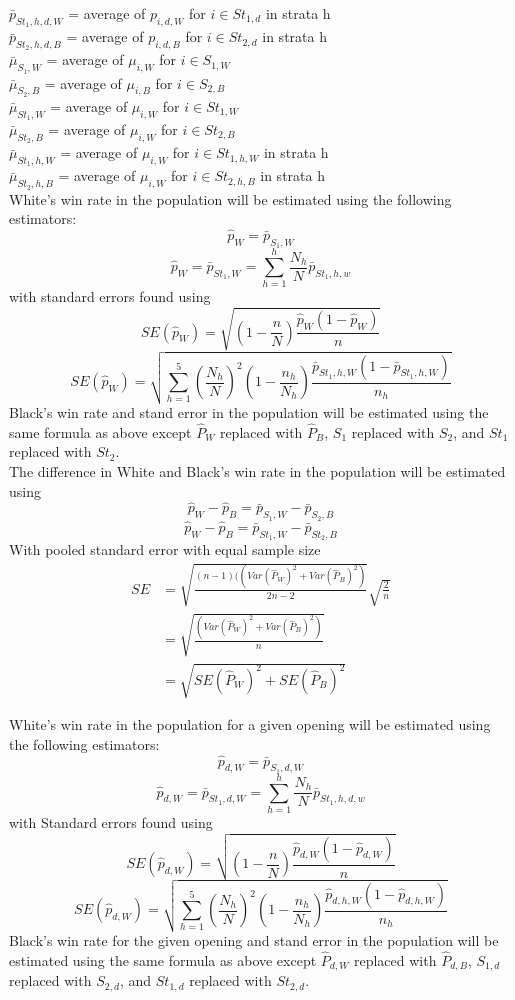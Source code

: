 \documentclass[11pt,]{article}
\begin{document}
\(\bar p_{St_1,h,d,W}\) = average of \(p_{i,d,W}\) for
\(i \in St_{1,d}\) in strata h\\
\(\bar p_{St_2,h,d,B}\) = average of \(p_{i,d,B}\) for
\(i \in St_{2,d}\) in strata h\\
\(\bar \mu_{S_1, W}\) = average of \(\mu_{i,W}\) for \(i \in S_{1,W}\)\\
\(\bar \mu_{S_2, B}\) = average of \(\mu_{i,B}\) for \(i \in S_{2,B}\)\\
\(\bar \mu_{St_1, W}\) = average of \(\mu_{i,W}\) for
\(i \in St_{1,W}\)\\
\(\bar \mu_{St_2, B}\) = average of \(\mu_{i,W}\) for
\(i \in St_{2,B}\)\\
\(\bar \mu_{St_1, h,W}\) = average of \(\mu_{i,W}\) for
\(i \in St_{1,h,W}\) in strata h\\
\(\bar \mu_{St_2, h,B}\) = average of \(\mu_{i,W}\) for
\(i \in St_{2,h,B}\) in strata h\\
\newline White's win rate in the population will be estimated using the
following estimators: \[\hat p_{W} = \bar p_{S_1,W}\]
\[\hat p_{W} = \bar p_{St_1,W} = \sum_{h=1}^{h}\frac{N_h}{N}\bar p_{St_1,h,w}\]
with standard errors found using
\[SE(\hat p_{W}) = \sqrt{(1-\frac{n}{N})\frac{\hat p_{W}(1-\hat p_{W})}{n}}\]
\[SE(\hat p_{W}) = \sqrt{\sum_{h=1}^{5}(\frac{N_h}{N})^2(1-\frac{n_h}{N_h})\frac{\bar p_{St_1,h,W}(1-\bar p_{St_1,h,W})}{n_h}}\]
Black's win rate and stand error in the population will be estimated
using the same formula as above except \(\hat P_{W}\) replaced with
\(\hat P_{B}\), \(S_1\) replaced with \(S_2\), and \(St_1\) replaced
with \(St_2\).\\
\newline The difference in White and Black's win rate in the population
will be estimated using
\[\hat p_{W} - \hat p_{B} = \bar p_{S_1,W} - \bar p_{S_2,B}\]
\[\hat p_{W} - \hat p_{B} = \bar p_{St_1,W} - \bar p_{St_2,B}\] With
pooled standard error with equal sample size \begin{align*}
SE &= \sqrt{\frac{(n-1)((Var(\hat P_W)^2 + Var(\hat P_B)^2)}{2n-2}}\sqrt{\frac{2}{n}}\\
&=\sqrt{\frac{(Var(\hat P_W)^2 + Var(\hat P_B)^2)}{n}}\\
&= \sqrt{SE(\hat P_W)^2 + SE(\hat P_B)^2}
\end{align*} \newline

White's win rate in the population for a given opening will be estimated
using the following estimators: \[\hat p_{d, W} = \bar p_{S_1,d,W} \]
\[\hat p_{d,W} = \bar p_{St_1,d,W} = \sum_{h=1}^{h}\frac{N_h}{N}\bar p_{St_1,h,d,w}\]
with Standard errors found using
\[SE(\hat p_{d, W}) = \sqrt{(1-\frac{n}{N})\frac{\hat p_{d, W}(1-\hat p_{d, W})}{n}}\]
\[SE(\hat p_{d, W}) = \sqrt{\sum_{h=1}^{5}(\frac{N_h}{N})^2(1-\frac{n_h}{N_h})\frac{\hat p_{d,h,W}(1-\hat p_{d,h,W})}{n_{h}}}\]
Black's win rate for the given opening and stand error in the population
will be estimated using the same formula as above except
\(\hat P_{d,W}\) replaced with \(\hat P_{d,B}\), \(S_{1,d}\) replaced
with \(S_{2,d}\), and \(St_{1,d}\) replaced with \(St_{2,d}\).
\end{document}

